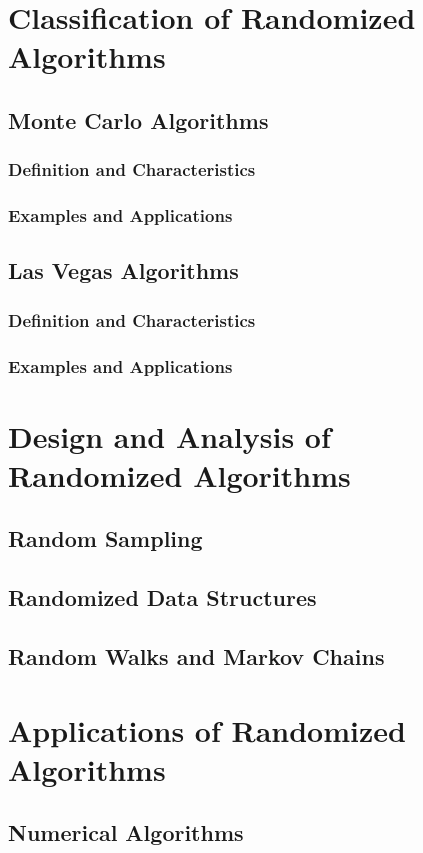 \documentclass[12pt]{book} %
\begin{document}
\section{Classification of Randomized Algorithms}
\subsection{Monte Carlo Algorithms}
\subsubsection{Definition and Characteristics}
\subsubsection{Examples and Applications}
\subsection{Las Vegas Algorithms}
\subsubsection{Definition and Characteristics}
\subsubsection{Examples and Applications}

\section{Design and Analysis of Randomized Algorithms}
\subsection{Random Sampling}
\subsection{Randomized Data Structures}
\subsection{Random Walks and Markov Chains}

\section{Applications of Randomized Algorithms}
\subsection{Numerical Algorithms}
\end{document}
